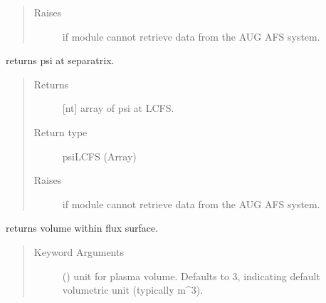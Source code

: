 \documentclass[letterpaper,10pt,english]{sphinxmanual}
\begin{document}
\begin{fulllineitems}
\begin{fulllineitems}
\begin{quote}
\begin{description}
\item[{Raises}] \leavevmode
{} \textendash{} if module cannot retrieve data from the AUG AFS system.

\end{description}\end{quote}

\end{fulllineitems}


\begin{fulllineitems}
\label{\detokenize{eqtools:eqtools.AUGData.AUGDDData.getFluxLCFS}}
returns psi at separatrix.
\begin{quote}\begin{description}
\item[{Returns}] \leavevmode
{[}nt{]} array of psi at LCFS.

\item[{Return type}] \leavevmode
psiLCFS (Array)

\item[{Raises}] \leavevmode
{} \textendash{} if module cannot retrieve data from the AUG AFS system.

\end{description}\end{quote}

\end{fulllineitems}


\begin{fulllineitems}
\label{\detokenize{eqtools:eqtools.AUGData.AUGDDData.getFluxVol}}
returns volume within flux surface.
\begin{quote}\begin{description}
\item[{Keyword Arguments}] \leavevmode
{} () \textendash{} unit for plasma volume.  Defaults to 3,
indicating default volumetric unit (typically m\textasciicircum{}3).


\end{description}
\end{quote}
\end{fulllineitems}
\end{fulllineitems}
\end{document}
